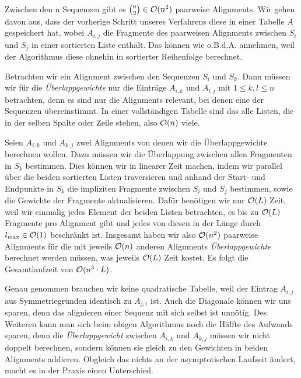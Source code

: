 \begin{beweis}
	Zwischen den n Sequenzen gibt es ${{n}\choose{2}} \in \mathcal{O}(n^2)$ paarweise Alignments. Wir gehen davon aus, dass der vorherige Schritt unseres Verfahrens diese in einer Tabelle $A$ gespeichert hat, wobei $A_{i,j}$ die Fragmente des paarweisen Alignments zwischen $S_i$ und $S_j$ in einer sortierten Liste enthält. Das können wie o.B.d.A. annehmen, weil der Algorithmus diese ohnehin in sortierter Reihenfolge berechnet.
	
	Betrachten wir ein Alignment zwischen den Sequenzen $S_i$ und $S_k$. Dann müssen wir für die \emph{Überlappgewichte} nur die Einträge $A_{i,k}$ und $A_{l,j}$ mit $1 \leq k,l \leq n$ betrachten, denn es sind nur die Alignments relevant, bei denen eine der Sequenzen übereinstimmt. In einer vollständigen Tabelle sind das alle Listen, die in der selben Spalte oder Zeile stehen, also $\mathcal{O}(n)$ viele.
	
	Seien $A_{i,k}$ und $A_{k,j}$ zwei Alignments von denen wir die Überlappgewichte berechnen wollen. Dazu müssen wir die Überlappung zwischen allen Fragmenten in $S_k$ bestimmen. Dies können wir in linearer Zeit machen, indem wir parallel über die beiden sortierten Listen traversieren und anhand der Start- und Endpunkte in $S_k$ die impliziten Fragmente zwischen $S_i$ und $S_j$ bestimmen, sowie die Gewichte der Fragmente aktualisieren. Dafür benötigen wir nur $\mathcal{O}(L)$ Zeit, weil wir einmalig jedes Element der beiden Listen betrachten, es bis zu $\mathcal{O}(L)$ Fragmente pro Alignment gibt und jedes von diesen in der Länge durch $l_{\max} \in \mathcal{O}(1)$ beschränkt ist.
	Insgesamt haben wir also $\mathcal{O}(n^2)$ paarweise Alignments für die mit jeweils $\mathcal{O}(n)$ anderen Alignments \emph{Überlappgewichte} berechnet werden müssen, was jeweils $\mathcal{O}(L)$ Zeit kostet. Es folgt die Gesamtlaufzeit von $\mathcal{O}(n^3\cdot L)$.
\end{beweis}

Genau genommen brauchen wir keine quadratische Tabelle, weil der Eintrag $A_{i,j}$ aus Symmetriegründen identisch zu $A_{j,i}$ ist. Auch die Diagonale können wir uns sparen, denn das alignieren einer Sequenz mit sich selbst ist unnötig. Des Weiteren kann man sich beim obigen Algorithmus noch die Hälfte des Aufwands sparen, denn die \emph{Überlappgewicht} zwischen $A_{i,k}$ und $A_{k,j}$ müssen wir nicht doppelt berechnen, sondern können sie gleich zu den Gewichten in beiden Alignments addieren. Obgleich das nichts an der asymptotischen Laufzeit ändert, macht es in der Praxis einen Unterschied. 

